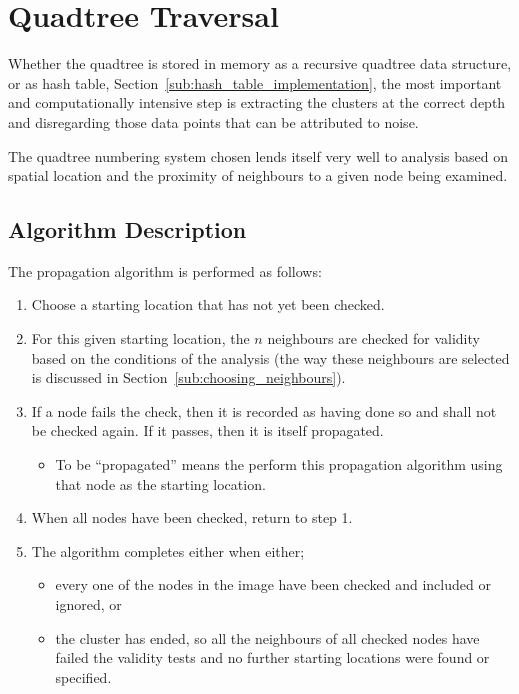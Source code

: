 
\section{Quadtree Traversal}
\label{sec:quadtree_traversal}


Whether the quadtree is stored in memory as a recursive quadtree data
structure, or as hash table, Section~\ref{sub:hash_table_implementation}, the
most important and computationally intensive step is extracting the clusters at
the correct depth and disregarding those data points that can be attributed to
noise.

The quadtree numbering system chosen lends itself very well to analysis based
on spatial location and the proximity of neighbours to a given node being
examined.

\subsection{Algorithm Description}
\label{sub:algorithm_description}

The propagation algorithm is performed as follows:
\begin{enumerate}
	\item Choose a starting location that has not yet been checked.
	\item For this given starting location, the $n$ neighbours are checked for
		validity based on the conditions of the analysis (the way these
		neighbours are selected is discussed in
		Section~\ref{sub:choosing_neighbours}).
	\item If a node fails the check, then it is recorded as having done so and
		shall not be checked again. If it passes, then it is itself propagated.
		\begin{itemize}
			\item To be ``propagated'' means the perform this propagation
				algorithm using that node as the starting location.
		\end{itemize}
	\item When all nodes have been checked, return to step 1.
	\item The algorithm completes either when either;
	\begin{itemize}
		\item every one of the nodes in the image have been checked and
			included or ignored, or
		\item the cluster has ended, so all the neighbours of all checked nodes
			have failed the validity tests and no further starting locations
			were found or specified.
	\end{itemize}
\end{enumerate}

